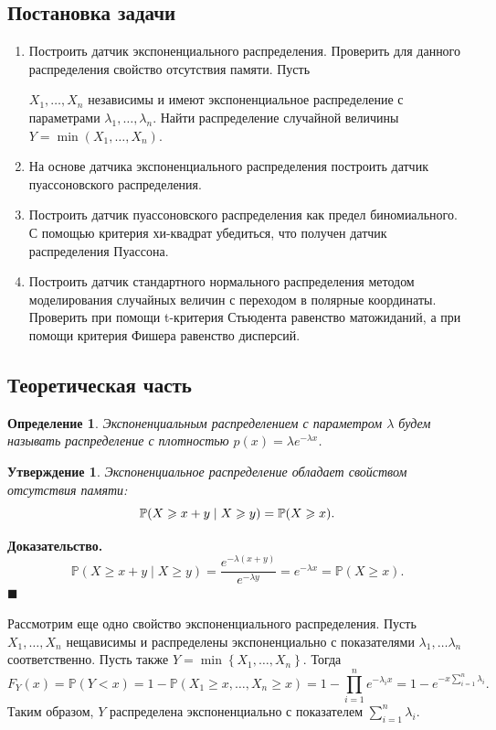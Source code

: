 \documentclass[12pt, a4paper]{article} %
\renewcommand{\ge}{\geqslant}
\def\Pro{\mathbb{P}} %
\newcommand*{\hm}[1]{#1\nobreak\discretionary{}%
            {\hbox{\mathsurround=0pt #1}}{}}
\newtheorem{St}{Утверждение}
\newtheorem{Def}{Определение}
\newenvironment{Proof}{\par\textbf{Доказательство. }}
	{\hfill$\blacksquare$\vspace{0.1cm}}
\begin{document}
\subsection{Постановка задачи}
\begin{enumerate}
\item Построить датчик экспоненциального распределения. Проверить для данного распределения свойство отсутствия памяти. 
    Пусть\par $X_1, \ldots, X_n$ независимы и имеют экспоненциальное распределение с параметрами $\lambda_1, \ldots, \lambda_n$. Найти распределение случайной величины $Y = \min(X_1, \ldots, X_n)$.
\item На основе датчика экспоненциального распределения построить датчик пуассоновского распределения.
\item Построить датчик пуассоновского распределения как предел биномиального. С помощью критерия хи-квадрат убедиться, что получен датчик распределения Пуассона.
\item Построить датчик стандартного нормального распределения методом моделирования случайных величин с переходом в полярные координаты. Проверить при помощи t-критерия Стьюдента равенство матожиданий, а при помощи критерия Фишера равенство дисперсий.
\end{enumerate}

\subsection{Теоретическая часть}

\begin{Def}
    Экспоненциальным распределением с параметром $\lambda$ будем называть 
    распределение с плотностью $p(x) = \lambda e^{-\lambda x}$.
\end{Def} 
\begin{St}
    Экспоненциальное распределение обладает свойством отсутствия памяти:
    $$
    \Pro (X \ge x + y \mid X \ge y) \hm= \Pro(X \ge x).
    $$
\end{St} 
\begin{Proof}
    \begin{equation*}
        \Pro (X \ge x + y \mid X \ge y) = 
        \frac{e^{-\lambda (x + y)}}{e^{-\lambda y}} = e^{-\lambda x} = 
        \Pro(X \ge x).
    \end{equation*}
\end{Proof} 

Рассмотрим еще одно свойство экспоненциального распределения.
Пусть $X_1, \ldots , X_n$ нещависимы и распределены экспоненциально с
показателями $\lambda_1,\ldots \lambda_n$ соответственно.
Пусть также $Y = \min \left\{ X_1,\ldots , X_n \right\}$.
Тогда 
\[
    F_Y(x) =\Pro(Y < x) = 
    1 - \Pro\left( X_1 \ge x,\ldots , X_n \ge x \right) =
    1 - \prod\limits_{i=1}^{n} e^{-\lambda_i x} =
    1 - e^{-x\sum\limits_{i=1}^{n} \lambda_i}.
\] 
Таким образом, $Y$ распределена экспоненциально с показателем  $\sum\limits_{i=1}^{n} \lambda_i$.
\end{document}
